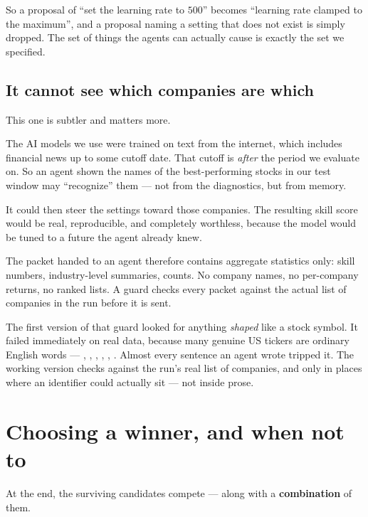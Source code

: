 \documentclass[11pt]{article}
\begin{document}
So a proposal of ``set the learning rate to $500$'' becomes ``learning rate clamped to
the maximum'', and a proposal naming a setting that does not exist is simply dropped. The
set of things the agents can actually cause is exactly the set we specified.

\subsection*{It cannot see which companies are which}

This one is subtler and matters more.

\begin{keybox}
The AI models we use were trained on text from the internet, which includes financial
news up to some cutoff date. That cutoff is \emph{after} the period we evaluate on. So
an agent shown the names of the best-performing stocks in our test window may
``recognize'' them --- not from the diagnostics, but from memory.

It could then steer the settings toward those companies. The resulting skill score
would be real, reproducible, and completely worthless, because the model would be
tuned to a future the agent already knew.
\end{keybox}

The packet handed to an agent therefore contains aggregate statistics only: skill
numbers, industry-level summaries, counts. No company names, no per-company returns, no
ranked lists. A guard checks every packet against the actual list of companies in the
run before it is sent.

\begin{notebox}
The first version of that guard looked for anything \emph{shaped} like a stock symbol.
It failed immediately on real data, because many genuine US tickers are ordinary
English words --- , , , , ,
. Almost every sentence an agent wrote tripped it. The working version
checks against the run's real list of companies, and only in places where an identifier
could actually sit --- not inside prose.
\end{notebox}

\section{Choosing a winner, and when not to}

At the end, the surviving candidates compete --- along with a \textbf{combination} of
them.
\end{document}
